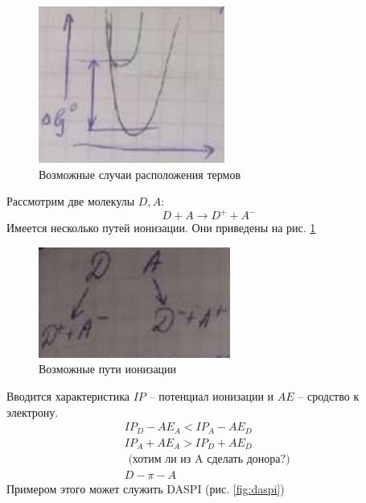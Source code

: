 \begin{lecture}
\begin{lecSection}
\begin{figure}[H]
\begin{minipage}[h]{0.28\linewidth}
		\centering\includegraphics[width=\linewidth]{lecture_04/graph3}
	\end{minipage}
	\caption{Возможные случаи расположения термов}
	\end{figure}

	Рассмотрим две молекулы $ D, A $:
	\begin{equation*}
		D + A \rightarrow D^{+} + A^{-}
	\end{equation*}
	Имеется несколько путей ионизации. Они приведены на рис. \ref{fig:possible_ways_of_ionization}
	\begin{figure}
		\centering\includegraphics{lecture_04/diag1}
		\caption{Возможные пути ионизации}
		\label{fig:possible_ways_of_ionization}
	\end{figure}
	Вводится характеристика $ IP $ -- потенциал ионизации и $ AE $ -- сродство к электрону.
	\begin{gather*}
		IP_D - AE_A < IP_A - AE_D \\
		IP_A + AE_A > IP_D + AE_D \\
		\text{ (хотим ли из A сделать донора?) } \\
		D - \pi - A
	\end{gather*}
	Примером этого может служить DASPI (рис. \ref{fig:daspi})
	

\end{lecSection}
\end{lecture}
